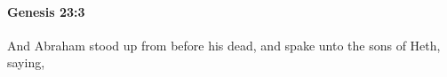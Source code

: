 
		\paragraph{Genesis 23:3} %
			\label{GENESIS-23-3}

			And Abraham stood up from before his dead, and spake unto the sons of Heth, saying,


